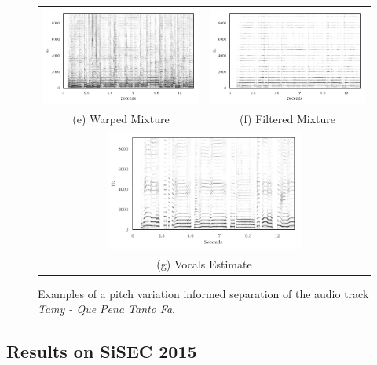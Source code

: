 \begin{figure}
\begin{tabular}{cc}
\includegraphics[width=65mm]{Chapters/05_Separation_Known/warp-demo/warped.pdf} & \includegraphics[width=65mm]{Chapters/05_Separation_Known/warp-demo/warped_filtered.pdf} \\
(e) Warped Mixture & (f) Filtered Mixture \\[6pt]
\multicolumn{2}{c}{\includegraphics[width=65mm]{Chapters/05_Separation_Known/warp-demo/Estimate.pdf} }\\
\multicolumn{2}{c}{(g) Vocals Estimate}
\end{tabular}
\caption{Examples of a pitch variation informed separation of the audio track \emph{Tamy - Que Pena Tanto Fa}.}%
\label{fig:warp_demo}
\end{figure}

\subsection{Results on SiSEC 2015}
\label{ssec:performance}


